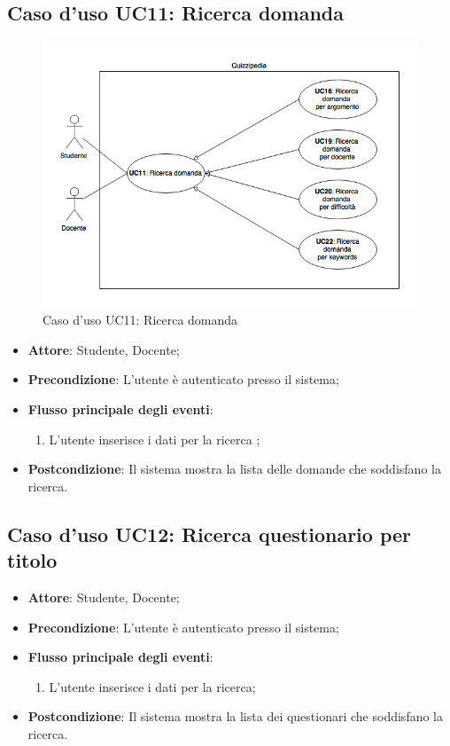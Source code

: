\documentclass[12pt,a4paper]{article}
\begin{document}
\subsection{Caso d'uso UC11: Ricerca domanda}
\begin{figure}[H]
	\centering
	\includegraphics[width=\textwidth]{../img/diagramUC11.png}
	\caption{Caso d'uso UC11: Ricerca domanda}\label{fig:UC11} 
\end{figure}
\begin{itemize}

\item \textbf{Attore}: Studente, Docente; 
\item \textbf{Precondizione}: L'utente è autenticato presso il sistema;

\item \textbf{Flusso principale degli eventi}:
\begin{enumerate}
	\item L'utente inserisce i dati per la ricerca	;
	
\end{enumerate}
\item \textbf{Postcondizione}: Il sistema mostra la lista delle domande che soddisfano la ricerca.
\end{itemize}
\hypertarget{UC12}{}
\subsection{Caso d'uso UC12: Ricerca questionario per titolo}

\begin{itemize}

\item \textbf{Attore}: Studente, Docente; 
\item \textbf{Precondizione}: L'utente è autenticato presso il sistema;

\item \textbf{Flusso principale degli eventi}:
\begin{enumerate}
	\item L'utente inserisce i dati per la ricerca;
	
\end{enumerate}
\item \textbf{Postcondizione}: Il sistema mostra la lista dei questionari che soddisfano la ricerca.
\end{itemize}
\hypertarget{UC13}{}
\end{document}
